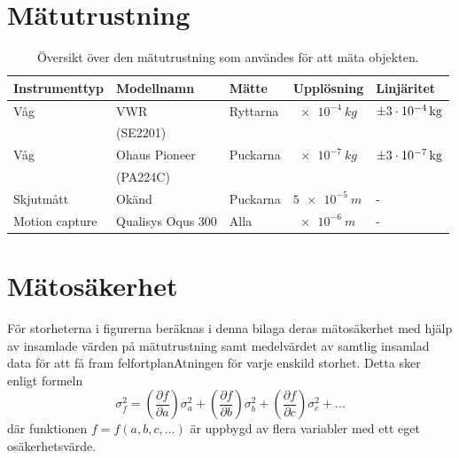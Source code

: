 \section{Mätutrustning} \label{bil:mätutr.}
\begin{table}[H]
\centering
\caption{Översikt över den mätutrustning som användes för att mäta objekten.}
\label{tab:mätutr.}
\begin{tabular}{@{}lllll@{}}
\toprule
Instrumenttyp & Modellnamn     & Mätte         & Upplösning        & Linjäritet            \\ \midrule
Våg           & VWR   & Ryttarna & $\SI{e-4}{kg}$    & $\SI{\pm 3e-4}{kg}$   \\
& (SE2201)   & &     &    \\
Våg           & Ohaus Pioneer & Puckarna    & $\SI{e-7}{kg}$    & $\qty{\pm 3e-7}{kg}$  \\
           & (PA224C) & &  &   \\
Skjutmått     & Okänd         & Puckarna    & $\qty{5e-5}{m}$   & -                     \\ 
Motion capture & Qualisys Oqus 300 & Alla           & $\qty{e-6}{m}$    & -                     \\ \bottomrule
\end{tabular}
\end{table}

\section{Mätosäkerhet}\label{bil:mätos}
För storheterna i figurerna beräknas i denna bilaga deras mätosäkerhet med hjälp av insamlade värden på mätutrustning samt medelvärdet av samtlig insamlad data för att få fram felfortplanAtningen för varje enskild storhet. Detta sker enligt formeln
\begin{equation}\nonumber
\sigma_{f}^2 = \left(\frac{\partial f}{\partial a}\right)\sigma_{a}^2 + \left(\frac{\partial f}{\partial b}\right)\sigma_{b}^2 + \left(\frac{\partial f}{\partial c}\right)\sigma_{c}^2 + ...
\end{equation}
där funktionen $f = f(a,b,c,...)$ är uppbygd av flera variabler med ett eget osäkerhetsvärde.

